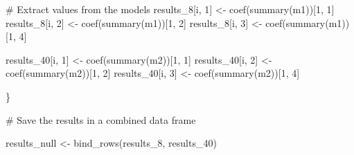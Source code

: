 \documentclass[
  letterpaper,
  DIV=11,
  numbers=noendperiod]{scrreprt}
\newenvironment{Shaded}{\begin{snugshade}}{\end{snugshade}}
\newcommand{\CommentTok}[1]{\textcolor[rgb]{0.37,0.37,0.37}{#1}}
\newcommand{\DecValTok}[1]{\textcolor[rgb]{0.68,0.00,0.00}{#1}}
\newcommand{\FloatTok}[1]{\textcolor[rgb]{0.68,0.00,0.00}{#1}}
\newcommand{\FunctionTok}[1]{\textcolor[rgb]{0.28,0.35,0.67}{#1}}
\newcommand{\NormalTok}[1]{\textcolor[rgb]{0.00,0.23,0.31}{#1}}
\newcommand{\OtherTok}[1]{\textcolor[rgb]{0.00,0.23,0.31}{#1}}
\newcommand{\SpecialCharTok}[1]{\textcolor[rgb]{0.37,0.37,0.37}{#1}}
\begin{document}
\begin{Shaded}
\begin{Highlighting}[]
  \CommentTok{\# Extract values from the models}
\NormalTok{  results\_8[i, }\DecValTok{1}\NormalTok{] }\OtherTok{\textless{}{-}} \FunctionTok{coef}\NormalTok{(}\FunctionTok{summary}\NormalTok{(m1))[}\DecValTok{1}\NormalTok{, }\DecValTok{1}\NormalTok{]}
\NormalTok{  results\_8[i, }\DecValTok{2}\NormalTok{] }\OtherTok{\textless{}{-}} \FunctionTok{coef}\NormalTok{(}\FunctionTok{summary}\NormalTok{(m1))[}\DecValTok{1}\NormalTok{, }\DecValTok{2}\NormalTok{]}
\NormalTok{  results\_8[i, }\DecValTok{3}\NormalTok{] }\OtherTok{\textless{}{-}} \FunctionTok{coef}\NormalTok{(}\FunctionTok{summary}\NormalTok{(m1))[}\DecValTok{1}\NormalTok{, }\DecValTok{4}\NormalTok{]}

\NormalTok{  results\_40[i, }\DecValTok{1}\NormalTok{] }\OtherTok{\textless{}{-}} \FunctionTok{coef}\NormalTok{(}\FunctionTok{summary}\NormalTok{(m2))[}\DecValTok{1}\NormalTok{, }\DecValTok{1}\NormalTok{]}
\NormalTok{  results\_40[i, }\DecValTok{2}\NormalTok{] }\OtherTok{\textless{}{-}} \FunctionTok{coef}\NormalTok{(}\FunctionTok{summary}\NormalTok{(m2))[}\DecValTok{1}\NormalTok{, }\DecValTok{2}\NormalTok{]}
\NormalTok{  results\_40[i, }\DecValTok{3}\NormalTok{] }\OtherTok{\textless{}{-}} \FunctionTok{coef}\NormalTok{(}\FunctionTok{summary}\NormalTok{(m2))[}\DecValTok{1}\NormalTok{, }\DecValTok{4}\NormalTok{]}
  
  
\NormalTok{\}}


\CommentTok{\# Save the results in a combined data frame}

\NormalTok{results\_null }\OtherTok{\textless{}{-}} \FunctionTok{bind\_rows}\NormalTok{(results\_8, results\_40)}
\end{Highlighting}
\end{Shaded}

\begin{Shaded}
\end{Shaded}
\end{document}
